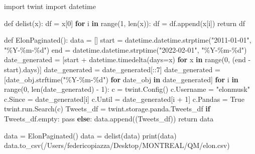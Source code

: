 \documentclass[
]{article}
\newenvironment{Shaded}{\begin{snugshade}}{\end{snugshade}}
\newcommand{\AttributeTok}[1]{\textcolor[rgb]{0.77,0.63,0.00}{#1}}
\newcommand{\ControlFlowTok}[1]{\textcolor[rgb]{0.13,0.29,0.53}{\textbf{#1}}}
\newcommand{\DecValTok}[1]{\textcolor[rgb]{0.00,0.00,0.81}{#1}}
\newcommand{\FunctionTok}[1]{\textcolor[rgb]{0.00,0.00,0.00}{#1}}
\newcommand{\NormalTok}[1]{#1}
\newcommand{\OtherTok}[1]{\textcolor[rgb]{0.56,0.35,0.01}{#1}}
\newcommand{\SpecialCharTok}[1]{\textcolor[rgb]{0.00,0.00,0.00}{#1}}
\newcommand{\StringTok}[1]{\textcolor[rgb]{0.31,0.60,0.02}{#1}}
\begin{document}
\begin{Shaded}
\begin{Highlighting}[]
\NormalTok{import twint}
\NormalTok{import datetime}

\NormalTok{def }\FunctionTok{delist}\NormalTok{(x)}\SpecialCharTok{:}
\NormalTok{    df }\OtherTok{=}\NormalTok{ x[}\DecValTok{0}\NormalTok{]}
    \ControlFlowTok{for}\NormalTok{ i }\ControlFlowTok{in} \FunctionTok{range}\NormalTok{(}\DecValTok{1}\NormalTok{, }\FunctionTok{len}\NormalTok{(x))}\SpecialCharTok{:}
\NormalTok{        df }\OtherTok{=} \FunctionTok{df.append}\NormalTok{(x[i])}
\NormalTok{    return df}

\NormalTok{def }\FunctionTok{ElonPaginated}\NormalTok{()}\SpecialCharTok{:}
\NormalTok{    data }\OtherTok{=}\NormalTok{ []}
\NormalTok{    start }\OtherTok{=} \FunctionTok{datetime.datetime.strptime}\NormalTok{(}\StringTok{"2011{-}01{-}01"}\NormalTok{, }\StringTok{"\%Y{-}\%m{-}\%d"}\NormalTok{)}
\NormalTok{    end }\OtherTok{=} \FunctionTok{datetime.datetime.strptime}\NormalTok{(}\StringTok{"2022{-}02{-}01"}\NormalTok{, }\StringTok{"\%Y{-}\%m{-}\%d"}\NormalTok{)}
\NormalTok{    date\_generated }\OtherTok{=}\NormalTok{ [start }\SpecialCharTok{+} \FunctionTok{datetime.timedelta}\NormalTok{(}\AttributeTok{days=}\NormalTok{x) }\ControlFlowTok{for}\NormalTok{ x }\ControlFlowTok{in} \FunctionTok{range}\NormalTok{(}\DecValTok{0}\NormalTok{, (end }\SpecialCharTok{{-}}\NormalTok{ start).days)]}
\NormalTok{    date\_generated }\OtherTok{=}\NormalTok{ date\_generated[}\SpecialCharTok{::}\DecValTok{7}\NormalTok{]}
\NormalTok{    date\_generated }\OtherTok{=}\NormalTok{ [}\FunctionTok{date\_obj.strftime}\NormalTok{(}\StringTok{"\%Y{-}\%m{-}\%d"}\NormalTok{) }\ControlFlowTok{for}\NormalTok{ date\_obj }\ControlFlowTok{in}\NormalTok{ date\_generated]}
    \ControlFlowTok{for}\NormalTok{ i }\ControlFlowTok{in} \FunctionTok{range}\NormalTok{(}\DecValTok{0}\NormalTok{, }\FunctionTok{len}\NormalTok{(date\_generated) }\SpecialCharTok{{-}} \DecValTok{1}\NormalTok{)}\SpecialCharTok{:}
\NormalTok{        c }\OtherTok{=} \FunctionTok{twint.Config}\NormalTok{()}
\NormalTok{        c.Username }\OtherTok{=} \StringTok{"elonmusk"}
\NormalTok{        c.Since }\OtherTok{=}\NormalTok{ date\_generated[i]}
\NormalTok{        c.Until }\OtherTok{=}\NormalTok{ date\_generated[i }\SpecialCharTok{+} \DecValTok{1}\NormalTok{]}
\NormalTok{        c.Pandas }\OtherTok{=}\NormalTok{ True}
        \FunctionTok{twint.run.Search}\NormalTok{(c)}
\NormalTok{        Tweets\_df }\OtherTok{=}\NormalTok{ twint.storage.panda.Tweets\_df}
        \ControlFlowTok{if}\NormalTok{ Tweets\_df.empty}\SpecialCharTok{:}
\NormalTok{            pass}
        \ControlFlowTok{else}\SpecialCharTok{:} \FunctionTok{data.append}\NormalTok{((Tweets\_df))}
\NormalTok{    return data}

\NormalTok{data }\OtherTok{=} \FunctionTok{ElonPaginated}\NormalTok{()}
\NormalTok{data }\OtherTok{=} \FunctionTok{delist}\NormalTok{(data)}
\FunctionTok{print}\NormalTok{(data)}
\FunctionTok{data.to\_csv}\NormalTok{(}\StringTok{\textquotesingle{}/Users/federicopiazza/Desktop/MONTREAL/QM/elon.csv\textquotesingle{}}\NormalTok{)}
\end{Highlighting}
\end{Shaded}


\printbibliography
\end{document}
